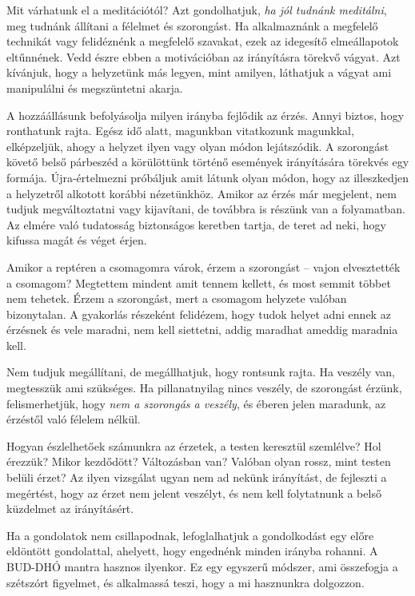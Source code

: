 Mit várhatunk el a meditációtól? Azt gondolhatjuk, \emph{ha jól tudnánk
meditálni}, meg tudnánk állítani a félelmet és szorongást. Ha
alkalmaznánk a megfelelő technikát vagy felidéznénk a megfelelő
szavakat, ezek az idegesítő elmeállapotok eltűnnének. Vedd észre ebben a
motivációban az irányításra törekvő vágyat. Azt kívánjuk, hogy a
helyzetünk más legyen, mint amilyen, láthatjuk a vágyat ami manipulálni
és megszüntetni akarja.

A hozzáállásunk befolyásolja milyen irányba fejlődik az érzés. Annyi
biztos, hogy ronthatunk rajta. Egész idő alatt, magunkban vitatkozunk
magunkkal, elképzeljük, ahogy a helyzet ilyen vagy olyan módon
lejátszódik. A szorongást követő belső párbeszéd a körülöttünk történő
események irányítására törekvés egy formája. Újra-értelmezni próbáljuk
amit látunk olyan módon, hogy az illeszkedjen a helyzetről alkotott
korábbi nézetünkhöz. Amikor az érzés már megjelent, nem tudjuk
megváltoztatni vagy kijavítani, de továbbra is részünk van a
folyamatban. Az elmére való tudatosság biztonságos keretben tartja, de
teret ad neki, hogy kifussa magát és véget érjen.

Amikor a reptéren a csomagomra várok, érzem a szorongást -- vajon
elvesztették a csomagom? Megtettem mindent amit tennem kellett, és most
semmit többet nem tehetek. Érzem a szorongást, mert a csomagom helyzete
valóban bizonytalan. A gyakorlás részeként felidézem, hogy tudok helyet
adni ennek az érzésnek és vele maradni, nem kell siettetni, addig
maradhat ameddig maradnia kell.

Nem tudjuk megállítani, de megállhatjuk, hogy rontsunk rajta. Ha veszély
van, megtesszük ami szükséges. Ha pillanatnyilag nincs veszély, de
szorongást érzünk, felismerhetjük, hogy \emph{nem a szorongás a
veszély}, és éberen jelen maradunk, az érzéstől való félelem nélkül.


Hogyan észlelhetőek számunkra az érzetek, a testen keresztül szemlélve?
Hol érezzük? Mikor kezdődött? Változásban van? Valóban olyan rossz, mint
testen belüli érzet? Az ilyen vizsgálat ugyan nem ad nekünk irányítást,
de fejleszti a megértést, hogy az érzet nem jelent veszélyt, és nem kell
folytatnunk a belső küzdelmet az irányításért.

Ha a gondolatok nem csillapodnak, lefoglalhatjuk a gondolkodást egy
előre eldöntött gondolattal, ahelyett, hogy engednénk minden irányba
rohanni. A BUD-DHÓ mantra hasznos ilyenkor. Ez egy egyszerű módszer, ami
összefogja a szétszórt figyelmet, és alkalmassá teszi, hogy a mi
hasznunkra dolgozzon.

